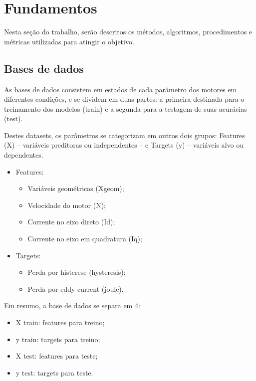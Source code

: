\documentclass{article}
\begin{document}
\section{Fundamentos}


Nesta seção do trabalho, serão descritos os métodos, algoritmos, procedimentos e métricas utilizadas para atingir o objetivo.



\subsection{Bases de dados}

As bases de dados consistem em estados de cada parâmetro dos motores em diferentes condições, e se dividem em duas partes: a primeira destinada para o treinamento dos modelos (train) e a segunda para a testagem de suas acurácias (test).

Destes datasets, os parâmetros se categorizam em outros dois grupos: Features (X) \--- variáveis preditoras ou independentes \--- e Targets (y) \--- variáveis alvo ou dependentes.

\begin{itemize}
    \item Features:
    \begin{itemize}
        \item Variáveis geométricas (Xgeom);
        \item Velocidade do motor (N);
        \item Corrente no eixo direto (Id);
        \item Corrente no eixo em quadratura (Iq);
    \end{itemize}
    \item Targets:
    \begin{itemize}
        \item Perda por histerese (hysteresis);
        \item Perda por eddy current (joule).    
    \end{itemize}
\end{itemize}

\noindent Em resumo, a base de dados se separa em 4:

\begin{itemize}
    \item X train: features para treino;
    \item y train: targets para treino;
    \item X test: features para teste;
    \item y test: targets para teste.
\end{itemize}
\end{document}
